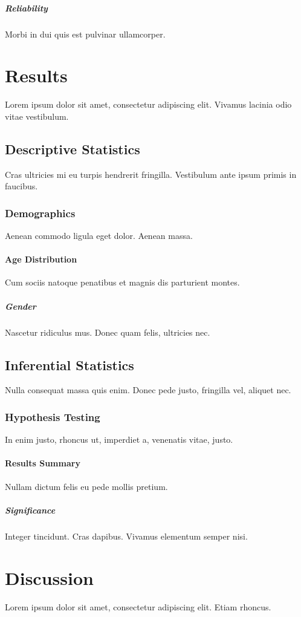 \documentclass{article}
\begin{document}
\subparagraph{Reliability}
Morbi in dui quis est pulvinar ullamcorper.

\section{Results}
Lorem ipsum dolor sit amet, consectetur adipiscing elit. Vivamus lacinia odio vitae vestibulum.

\subsection{Descriptive Statistics}
Cras ultricies mi eu turpis hendrerit fringilla. Vestibulum ante ipsum primis in faucibus.

\subsubsection{Demographics}
Aenean commodo ligula eget dolor. Aenean massa.

\paragraph{Age Distribution}
Cum sociis natoque penatibus et magnis dis parturient montes.

\subparagraph{Gender}
Nascetur ridiculus mus. Donec quam felis, ultricies nec.

\subsection{Inferential Statistics}
Nulla consequat massa quis enim. Donec pede justo, fringilla vel, aliquet nec.

\subsubsection{Hypothesis Testing}
In enim justo, rhoncus ut, imperdiet a, venenatis vitae, justo.

\paragraph{Results Summary}
Nullam dictum felis eu pede mollis pretium.

\subparagraph{Significance}
Integer tincidunt. Cras dapibus. Vivamus elementum semper nisi.

\section{Discussion}
Lorem ipsum dolor sit amet, consectetur adipiscing elit. Etiam rhoncus.
\end{document}
